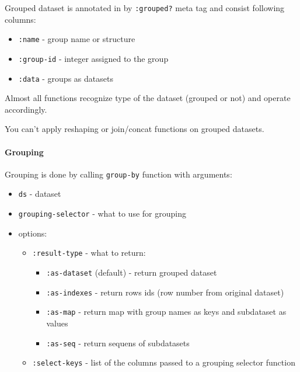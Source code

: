 \documentclass[]{article}
\providecommand{\tightlist}{%
  \setlength{\itemsep}{0pt}\setlength{\parskip}{0pt}}
\let\oldparagraph\paragraph
\renewcommand{\paragraph}[1]{\oldparagraph{#1}\mbox{}}
\begin{document}
Grouped dataset is annotated in by \texttt{:grouped?} meta tag and
consist following columns:

\begin{itemize}
\tightlist
\item
  \texttt{:name} - group name or structure
\item
  \texttt{:group-id} - integer assigned to the group
\item
  \texttt{:data} - groups as datasets
\end{itemize}

Almost all functions recognize type of the dataset (grouped or not) and
operate accordingly.

You can't apply reshaping or join/concat functions on grouped datasets.

\paragraph{Grouping}\label{grouping}

Grouping is done by calling \texttt{group-by} function with arguments:

\begin{itemize}
\tightlist
\item
  \texttt{ds} - dataset
\item
  \texttt{grouping-selector} - what to use for grouping
\item
  options:

  \begin{itemize}
  \tightlist
  \item
    \texttt{:result-type} - what to return:

    \begin{itemize}
    \tightlist
    \item
      \texttt{:as-dataset} (default) - return grouped dataset
    \item
      \texttt{:as-indexes} - return rows ids (row number from original
      dataset)
    \item
      \texttt{:as-map} - return map with group names as keys and
      subdataset as values
    \item
      \texttt{:as-seq} - return sequens of subdatasets
    \end{itemize}
  \item
    \texttt{:select-keys} - list of the columns passed to a grouping
    selector function
  \end{itemize}
\end{itemize}
\end{document}
